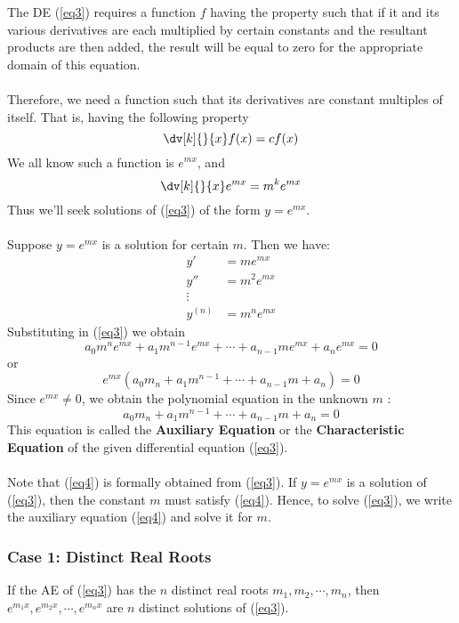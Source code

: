 The DE (\ref{eq3}) requires a function $f$ having the property such that if it and its various derivatives are each multiplied by certain constants and the resultant products are then added, the result will be equal to zero for the appropriate domain of this equation.\\~\\
Therefore, we need a function such that its derivatives are constant multiples of itself. That is, having the following property \[
    \dv[k]{}{x} f(x) = cf(x)
\]
We all know such a function is $e^{mx}$, and \[
    \dv[k]{}{x} e^{mx} = m^ke^{mx}
\]
Thus we'll seek solutions of (\ref{eq3}) of the form $y=e^{mx}$.\\~\\
Suppose $y=e^{mx}$ is a solution for certain $m$. Then we have:
\begin{align*}
    y' &= me^{mx} \\
    y'' &= m^2e^{mx} \\
    \vdots & \\
    y^{(n)} &= m^ne^{mx}
\end{align*}
Substituting in (\ref{eq3}) we obtain \[
    a_0m^ne^{mx} + a_1m^{n-1}e^{mx} + \cdots + a_{n-1}me^{mx} + a_ne^{mx} = 0
\] or \[
    e^{mx}( a_0m_n + a_1m^{n-1} + \cdots + a_{n-1}m + a_n ) = 0
\]
Since $e^{mx} \neq 0$, we obtain the polynomial equation in the unknown $m$ :
\begin{equation} \label{eq4}
    a_0m_n + a_1m^{n-1} + \cdots + a_{n-1}m + a_n = 0
\end{equation}
This equation is called the \textbf{Auxiliary Equation} or the \textbf{Characteristic Equation} of the given differential equation (\ref{eq3}).\\~\\
Note that (\ref{eq4}) is formally obtained from (\ref{eq3}). If $y=e^{mx}$ is a solution of (\ref{eq3}), then the constant $m$ must satisfy (\ref{eq4}). Hence, to solve (\ref{eq3}), we write the auxiliary equation (\ref{eq4}) and solve it for $m$.


\vspace{20pt}
\subsubsection{Case 1: Distinct Real Roots}

If the AE of (\ref{eq3}) has the $n$ distinct real roots $m_1, m_2, \cdots, m_n$, then $e^{m_1x}, e^{m_2x}, \cdots, e^{m_nx}$ are $n$ distinct solutions of (\ref{eq3}).

